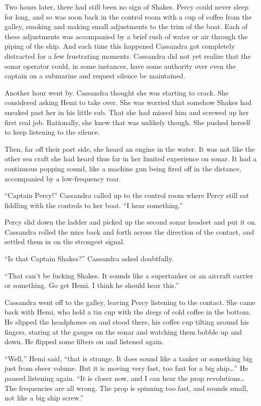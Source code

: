 \documentclass[
]{scrbook}
\begin{document}
Two hours later, there had still been no sign of Shakes. Percy could
never sleep for long, and so was soon back in the control room with a
cup of coffee from the galley, smoking and making small adjustments to
the trim of the boat. Each of these adjustments was accompanied by a
brief rush of water or air through the piping of the ship. And each time
this happened Cassandra got completely distracted for a few frustrating
moments. Cassandra did not yet realize that the sonar operator could, in
some instances, have some authority over even the captain on a submarine
and request silence be maintained.

Another hour went by. Cassandra thought she was starting to crack. She
considered asking Hemi to take over. She was worried that somehow Shakes
had sneaked past her in his little sub. That she had missed him and
screwed up her first real job. Rationally, she knew that was unlikely
though. She pushed herself to keep listening to the silence.

Then, far off their port side, she heard an engine in the water. It was
not like the other sea craft she had heard thus far in her limited
experience on sonar. It had a continuous popping sound, like a machine
gun being fired off in the distance, accompanied by a low-frequency
roar.

``Captain Percy!'' Cassandra called up to the control room where Percy
still sat fiddling with the controls to her boat. ``I hear something.''

Percy slid down the ladder and picked up the second sonar headset and
put it on. Cassandra rolled the mics back and forth across the direction
of the contact, and settled them in on the strongest signal.

``Is that Captain Shakes?'' Cassandra asked doubtfully.

``That can't be fucking Shakes. It sounds like a supertanker or an
aircraft carrier or something. Go get Hemi. I think he should hear
this.''

Cassandra went off to the galley, leaving Percy listening to the
contact. She came back with Hemi, who held a tin cup with the dregs of
cold coffee in the bottom. He slipped the headphones on and stood there,
his coffee cup tilting around his fingers, staring at the gauges on the
sonar and watching them bobble up and down. He flipped some filters on
and listened again.

``Well,'' Hemi said, ``that is strange. It does sound like a tanker or
something big just from sheer volume. But it is moving very fast, too
fast for a big ship\ldots{}'' He paused listening again. ``It is closer
now, and I can hear the prop revolutions\ldots{} The frequencies are all
wrong. The prop is spinning too fast, and sounds small, not like a big
ship screw.''
\end{document}
